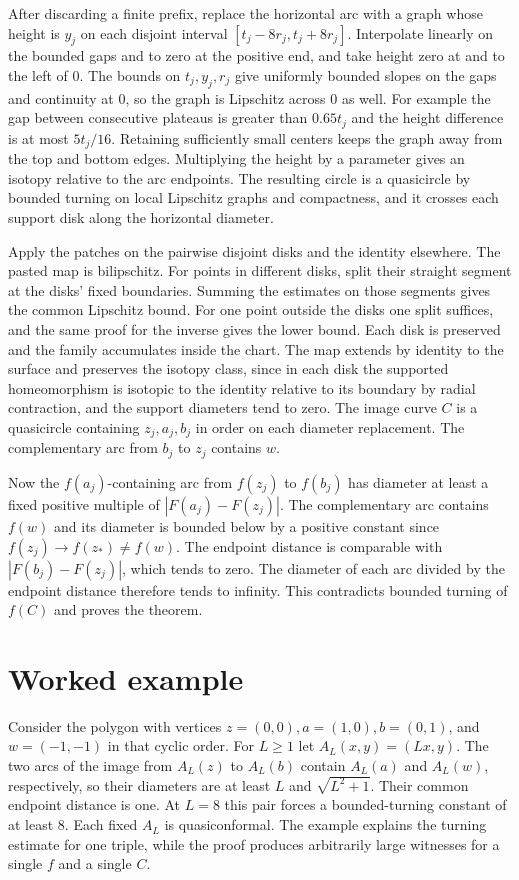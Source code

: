 \documentclass[11pt]{amsart}
\begin{document}
After discarding a finite prefix, replace the horizontal arc
with a graph whose height is \(y_j\) on each disjoint interval
\([t_j-8r_j,t_j+8r_j]\). Interpolate linearly on the bounded gaps
and to zero at the positive end, and take height zero at and to
the left of \(0\). The bounds on \(t_j,y_j,r_j\) give uniformly
bounded slopes on the gaps and continuity at \(0\), so the
graph is Lipschitz across \(0\) as well. For example the gap
between consecutive plateaus is greater than \(0.65t_j\) and
the height difference is at most \(5t_j/16\). Retaining sufficiently
small centers keeps the graph away from the top and bottom edges.
Multiplying the height by a parameter gives an isotopy relative
to the arc endpoints. The resulting circle is a quasicircle by
bounded turning on local Lipschitz graphs and compactness, and it
crosses each support disk along the horizontal diameter.

Apply the patches on the pairwise disjoint disks and the identity
elsewhere. The pasted map is bilipschitz. For points in different
disks, split their straight segment at the disks' fixed boundaries.
Summing the estimates on those segments gives the common Lipschitz
bound. For one point outside the disks one split suffices, and the
same proof for the inverse gives the lower bound. Each disk is
preserved and the family accumulates inside the chart. The map
extends by identity to the surface and preserves the isotopy
class, since in each disk the supported homeomorphism is isotopic
to the identity relative to its boundary by radial contraction,
and the support diameters tend to zero. The image curve \(C\)
is a quasicircle containing \(z_j,a_j,b_j\) in order on each
diameter replacement. The complementary arc from \(b_j\) to
\(z_j\) contains \(w\).

Now the \(f(a_j)\)-containing arc from \(f(z_j)\) to \(f(b_j)\)
has diameter at least a fixed positive multiple of
\(|F(a_j)-F(z_j)|\). The complementary arc contains \(f(w)\)
and its diameter is bounded below by a positive constant since
\(f(z_j)\to f(z_*)\ne f(w)\). The endpoint distance is comparable
with \(|F(b_j)-F(z_j)|\), which tends to zero. The diameter of each
arc divided by the endpoint distance therefore tends to infinity.
This contradicts bounded turning of \(f(C)\) and proves the theorem.

\section{Worked example}
Consider the polygon with vertices \(z=(0,0),a=(1,0),b=(0,1)\),
and \(w=(-1,-1)\) in that cyclic order. For \(L\ge1\) let
\(A_L(x,y)=(Lx,y)\). The two arcs of the image from \(A_L(z)\)
to \(A_L(b)\) contain \(A_L(a)\) and \(A_L(w)\), respectively,
so their diameters are at least \(L\) and \(\sqrt{L^2+1}\).
Their common endpoint distance is one. At \(L=8\) this pair forces
a bounded-turning constant of at least \(8\). Each fixed \(A_L\)
is quasiconformal. The example explains the turning estimate for
one triple, while the proof produces arbitrarily large witnesses
for a single \(f\) and a single \(C\).
\end{document}
